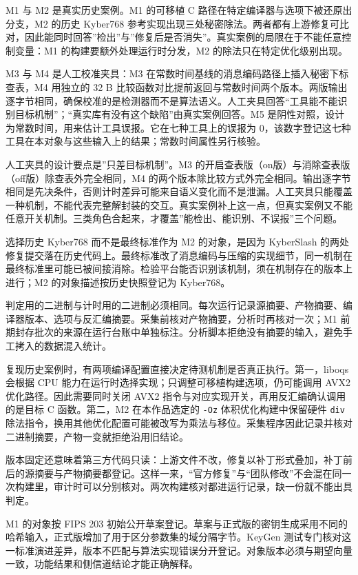 M1 与 M2 是真实历史案例。M1 的可移植 C 路径在特定编译器与选项下被还原出分支，M2 的历史 Kyber768 参考实现出现三处秘密除法\cite{kyber2018}。两者都有上游修复可比对，因此能同时回答”检出”与”修复后是否消失”。真实案例的局限在于不能任意控制变量：M1 的构建要额外处理运行时分发，M2 的除法只在特定优化级别出现。

M3 与 M4 是人工校准夹具：M3 在常数时间基线的消息编码路径上插入秘密下标查表，M4 用独立的 32 B 比较函数对比提前返回与常数时间两个版本。两版输出逐字节相同，确保校准的是检测器而不是算法语义。人工夹具回答“工具能不能识别目标机制”；“真实库有没有这个缺陷”由真实案例回答。M5 是阴性对照，设计为常数时间，用来估计工具误报。它在七种工具上的误报为 0，该数字登记这七种工具在本对象与这些输入上的结果；常数时间属性另行核验。

人工夹具的设计要点是”只差目标机制”。M3 的开启查表版（on版）与消除查表版（off版）除查表外完全相同，M4 的两个版本除比较方式外完全相同。输出逐字节相同是先决条件，否则计时差异可能来自语义变化而不是泄漏。人工夹具只能覆盖一种机制，不能代表完整解封装的交互。真实案例补上这一点，但真实案例又不能任意开关机制。三类角色合起来，才覆盖”能检出、能识别、不误报”三个问题。

选择历史 Kyber768 而不是最终标准作为 M2 的对象，是因为 KyberSlash 的两处修复提交落在历史代码上。最终标准改了消息编码与压缩的实现细节，同一机制在最终标准里可能已被间接消除。检验平台能否识别该机制，须在机制存在的版本上进行；M2 的对象描述按历史快照登记为 Kyber768。

判定用的二进制与计时用的二进制必须相同。每次运行记录源摘要、产物摘要、编译器版本、选项与反汇编摘要。采集前核对产物摘要，分析时再核对一次；M1 前期封存批次的来源在运行台账中单独标注。分析脚本拒绝没有摘要的输入，避免手工拷入的数据混入统计。

复现历史案例时，有两项编译配置直接决定待测机制是否真正执行。第一，liboqs 会根据 CPU 能力在运行时选择实现；只调整可移植构建选项，仍可能调用 AVX2 优化路径。因此需要同时关闭 AVX2 指令与对应实现开关，再用反汇编确认调用的是目标 C 函数。第二，M2 在本作品选定的 \texttt{-Oz} 体积优化构建中保留硬件 \texttt{div} 除法指令，换用其他优化配置可能被改写为乘法与移位。采集程序因此记录并核对二进制摘要，产物一变就拒绝沿用旧结论。

版本固定还意味着第三方代码只读：上游文件不改，修复以补丁形式叠加，补丁前后的源摘要与产物摘要都登记。这样一来，“官方修复”与“团队修改”不会混在同一次构建里，审计时可以分别核对。两次构建核对都进运行记录，缺一份就不能出具判定。

M1 的对象按 FIPS 203 初始公开草案登记。草案与正式版的密钥生成采用不同的哈希输入，正式版增加了用于区分参数集的域分隔字节。KeyGen 测试专门核对这一标准演进差异，版本不匹配与算法实现错误分开登记。对象版本必须与期望向量一致，功能结果和侧信道结论才能正确解释。

